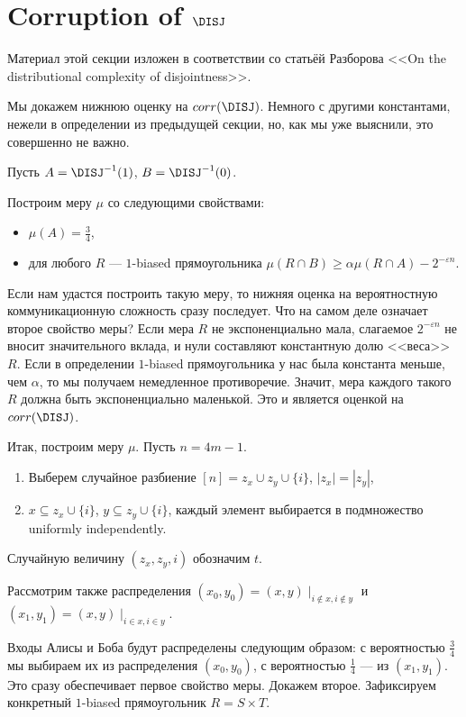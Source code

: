 \section{Corruption of $\DISJ$}

Материал этой секции изложен в соответствии со статьёй Разборова <<On the distributional complexity of disjointness>>.

Мы докажем нижнюю оценку на $corr(\DISJ)$. Немного с другими константами, нежели в определении из предыдущей секции, но, как мы уже выяснили, это совершенно не важно.

Пусть $A = \DISJ^{-1}(1)$, $B = \DISJ^{-1}(0)$.

Построим меру $\mu$ со следующими свойствами:

\begin{itemize}
    \item $\mu(A) = \frac{3}{4}$,
    \item для любого $R$ --- $1$-biased прямоугольника $\mu(R \cap B) \geq \alpha \mu(R \cap A) - 2^{-\varepsilon n}$.
\end{itemize}

Если нам удастся построить такую меру, то нижняя оценка на вероятностную коммуникационную сложность сразу последует. Что на самом деле означает второе свойство меры? Если мера $R$ не экспоненциально мала, слагаемое $2^{-\varepsilon n}$ не вносит значительного вклада, и нули составляют константную долю <<веса>> $R$. Если в определении $1$-biased прямоугольника у нас была константа меньше, чем $\alpha$, то мы получаем немедленное противоречие. Значит, мера каждого такого $R$ должна быть экспоненциально маленькой. Это и является оценкой на $corr(\DISJ)$.

Итак, построим меру $\mu$. Пусть $n = 4m - 1$.

\begin{enumerate}
    \item Выберем случайное разбиение $[n] = z_x \cup z_y \cup \{i\}$, $|z_x| = |z_y|$,
    \item $x \subseteq z_x \cup \{i\}$, $y \subseteq z_y \cup \{i\}$, каждый элемент выбирается в подмножество uniformly independently.
\end{enumerate}

Случайную величину $(z_x, z_y, i)$ обозначим $t$.

Рассмотрим также распределения $(x_0, y_0) = (x, y) \mid_{i \notin x, i \notin y}$ и $(x_1, y_1) = (x, y) \mid_{i \in x, i \in y}$.

Входы Алисы и Боба будут распределены следующим образом: с вероятностью $\frac{3}{4}$ мы выбираем их из распределения $(x_0, y_0)$, с вероятностью $\frac{1}{4}$ --- из $(x_1, y_1)$. Это сразу обеспечивает первое свойство меры. Докажем второе. Зафиксируем конкретный $1$-biased прямоугольник $R = S \times T$.

